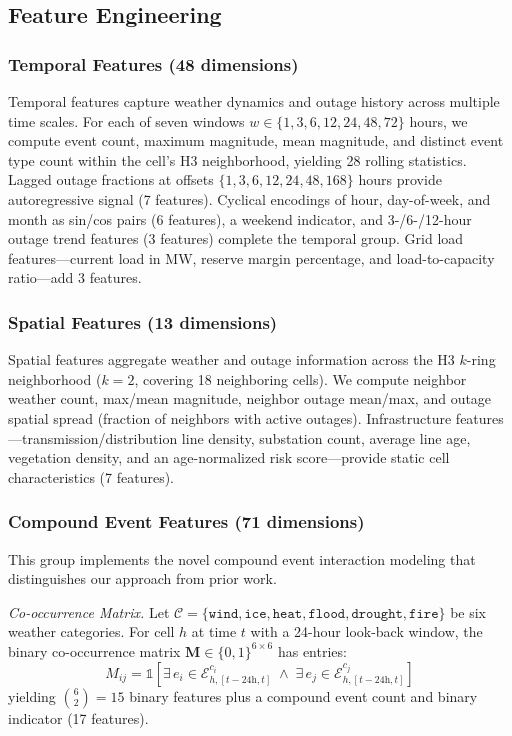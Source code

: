 \documentclass[conference]{IEEEtran}
\begin{document}
\subsection{Feature Engineering}\label{sec:features}

\subsubsection{Temporal Features (48 dimensions)}
Temporal features capture weather dynamics and outage history across multiple time scales. For each of seven windows $w \in \{1, 3, 6, 12, 24, 48, 72\}$ hours, we compute event count, maximum magnitude, mean magnitude, and distinct event type count within the cell's H3 neighborhood, yielding 28 rolling statistics. Lagged outage fractions at offsets $\{1, 3, 6, 12, 24, 48, 168\}$ hours provide autoregressive signal (7 features). Cyclical encodings of hour, day-of-week, and month as sin/cos pairs (6 features), a weekend indicator, and 3-/6-/12-hour outage trend features (3 features) complete the temporal group. Grid load features---current load in MW, reserve margin percentage, and load-to-capacity ratio---add 3 features.

\subsubsection{Spatial Features (13 dimensions)}
Spatial features aggregate weather and outage information across the H3 $k$-ring neighborhood ($k=2$, covering 18 neighboring cells). We compute neighbor weather count, max/mean magnitude, neighbor outage mean/max, and outage spatial spread (fraction of neighbors with active outages). Infrastructure features---transmission/distribution line density, substation count, average line age, vegetation density, and an age-normalized risk score---provide static cell characteristics (7 features).

\subsubsection{Compound Event Features (71 dimensions)}
This group implements the novel compound event interaction modeling that distinguishes our approach from prior work.

\textit{Co-occurrence Matrix.} Let $\mathcal{C} = \{\texttt{wind}, \texttt{ice}, \texttt{heat}, \texttt{flood}, \texttt{drought}, \texttt{fire}\}$ be six weather categories. For cell $h$ at time $t$ with a 24-hour look-back window, the binary co-occurrence matrix $\mathbf{M} \in \{0,1\}^{6 \times 6}$ has entries:
\begin{equation}\label{eq:cooccur}
    M_{ij} = \mathbb{1}\!\left[\exists\, e_i \in \mathcal{E}^{c_i}_{h,[t-24\text{h},t]} \;\wedge\; \exists\, e_j \in \mathcal{E}^{c_j}_{h,[t-24\text{h},t]}\right]
\end{equation}
yielding $\binom{6}{2} = 15$ binary features plus a compound event count and binary indicator (17 features).
\end{document}
